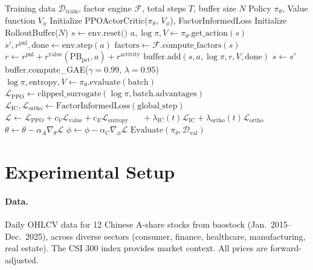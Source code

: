 \documentclass[11pt,a4paper]{article}
\begin{document}
\begin{algorithm}[H]
\caption{FI-PPO Training Loop}
\label{alg:fi_ppo}
\begin{algorithmic}[1]
\Require Training data $\mathcal{D}_{\text{train}}$, factor engine $\mathcal{F}$, total steps $T$, buffer size $N$
\Ensure Policy $\pi_\theta$, Value function $V_\phi$
\State Initialize PPOActorCritic($\pi_\theta$, $V_\phi$), FactorInformedLoss
\State Initialize RolloutBuffer($N$)
    \State $s \gets \text{env.reset()}$
     
        \State $a, \log\pi, V \gets \pi_\theta.\text{get\_action}(s)$
        \State $s', r^{\text{pnl}}, \text{done} \gets \text{env.step}(a)$
        \State $\text{factors} \gets \mathcal{F}.\text{compute\_factors}(s)$
        \State $r \gets r^{\text{pnl}} + r^{\text{value}}(\text{PB}_{\text{pct}},a) + r^{\text{activity}}$
        \State $\text{buffer.add}(s, a, \log\pi, r, V, \text{done})$
        \State $s \gets s'$
    \EndFor
    \State buffer.compute\_GAE($\gamma=0.99$, $\lambda=0.95$)
     
            \State $\log\pi, \text{entropy}, V \gets \pi_\theta.\text{evaluate}(\text{batch})$
            \State $\mathcal{L}_{\text{PPO}} \gets \text{clipped\_surrogate}(\log\pi, \text{batch.advantages})$
            \State $\mathcal{L}_{\text{IC}}, \mathcal{L}_{\text{ortho}} \gets \text{FactorInformedLoss}(\text{global\_step})$
            \State $\mathcal{L} \gets \mathcal{L}_{\text{PPO}} + c_V\mathcal{L}_{\text{value}} + c_E\mathcal{L}_{\text{entropy}}$
            \State $\quad\; + \lambda_{\text{IC}}(t)\mathcal{L}_{\text{IC}} + \lambda_{\text{ortho}}(t)\mathcal{L}_{\text{ortho}}$
            \State $\theta \gets \theta - \alpha_A \nabla_\theta \mathcal{L}$
            \State $\phi \gets \phi - \alpha_C \nabla_\phi \mathcal{L}$
        \EndFor
    \EndFor
        \State $\text{Evaluate}(\pi_\theta, \mathcal{D}_{\text{val}})$
    \EndIf
\EndFor
\end{algorithmic}
\end{algorithm}

\section{Experimental Setup}
\label{sec:experiments}

\paragraph{Data.} Daily OHLCV data for 12 Chinese A-share stocks from baostock (Jan.\ 2015--Dec.\ 2025), across diverse sectors (consumer, finance, healthcare, manufacturing, real estate). The CSI 300 index provides market context. All prices are forward-adjusted.
\end{document}
